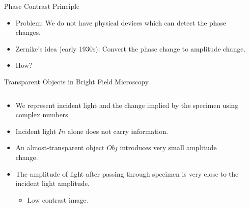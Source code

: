 \begin{frame}{Phase Contrast Principle}
	\begin{itemize}
		\item<1-> Problem: We do not have physical devices which can detect the phase changes.
		\item<2-> Zernike's idea (early 1930s): Convert the phase change to amplitude change.
		\item<3-> How?
	\end{itemize}
\end{frame}
\begin{frame}{Transparent Objects in Bright Field Microscopy}
	\begin{columns}[T,onlytextwidth]
		\begin{column}{0.6\textwidth}
			\begin{itemize}
				\item<1-> We represent incident light and the change implied by the specimen using complex numbers.
				\item<2-> Incident light $In$ alone does not carry information.
				\item<3-> An almost-transparent object $Obj$ introduces very small amplitude change.
				\item<4-> The amplitude of light after passing through specimen is very close to the incident light amplitude.
				      \begin{itemize}
					      \item<5-> Low contrast image.
				      \end{itemize}
			\end{itemize}
		\end{column}


		\begin{column}{0.4\textwidth}
		\end{column}



	\end{columns}
\end{frame}
